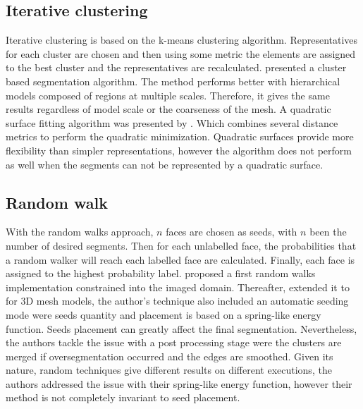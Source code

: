 

\subsection{Iterative clustering}

Iterative clustering is based on the k-means clustering algorithm.
Representatives for each cluster are chosen and then using some metric  the elements are assigned to the best cluster and the representatives are recalculated.
\cite{Lai2006} presented a cluster based segmentation algorithm.
The method performs better with hierarchical models composed of regions at multiple scales.
Therefore, it gives the same results regardless of model scale or the coarseness of the mesh.
A quadratic surface fitting algorithm was presented by \cite{Yan2012}.
Which combines several distance metrics to perform the quadratic minimization.
Quadratic surfaces provide more flexibility than simpler representations, however the algorithm does not perform as well when the segments 
can not be represented by a quadratic surface.



\subsection{Random walk}

With the random walks approach, $n$ faces are chosen as seeds, with $n$ been the number of desired segments.
Then for each unlabelled face, the probabilities that a random walker will reach each labelled face are calculated.
Finally, each face is assigned to the highest probability label.
\cite{Grady2006} proposed a first random walks implementation constrained into the imaged domain.
Thereafter, \cite{Lai2009} extended it to for 3D mesh models, the author's technique also included an automatic seeding mode were seeds quantity and placement is based on a spring-like energy function.
Seeds placement can greatly affect the final segmentation.
Nevertheless, the authors tackle the issue with a post processing stage were the clusters are merged if oversegmentation occurred and the edges are smoothed.
Given its nature, random techniques give different results on different executions, the authors addressed the issue with their spring-like energy function, however their method is not completely invariant to seed placement.
 

